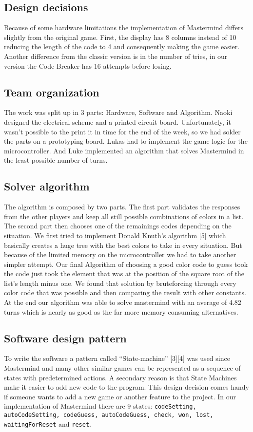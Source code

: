 \documentclass[a4paper, 12pt]{article}
\begin{document}
\subsection{Design decisions}
Because of some hardware limitations the implementation of Mastermind
differs slightly from the original game. First, the display has 8
columns instead of 10 reducing the length of the code to 4 and
consequently making the game easier. Another difference from the classic
version is in the number of tries, in our version the Code Breaker has
16 attempts before losing.

\subsection{Team organization}
The work was split up in 3 parts: Hardware, Software and Algorithm.
Naoki designed the electrical scheme and a printed circuit board.
Unfortunately, it wasn’t possible to the print it in time for the end of
the week, so we had solder the parts on a prototyping board. Lukas had
to implement the game logic for the microcontroller. And Luke
implemented an algorithm that solves Mastermind in the least possible
number of turns. 

\subsection{Solver algorithm}
The algorithm is composed by two parts. The first part validates the
responses from the other players and keep all still possible
combinations of colors in a list. The second part then chooses one of
the remainings codes depending on the situation. We first tried to
implement Donald Knuth's algorithm [5] which basically creates a huge
tree with the best colors to take in every situation. But because of the
limited memory on the microcontroller we had to take another simpler
attempt. Our final Algorithm of choosing a good color code to guess took
the code just took the element that was at the position of the square
root of the list’s length minus one. We found that solution by
bruteforcing through every color code that was possible and then
comparing the result with other constants. At the end our algorithm was
able to solve mastermind with an average of 4.82 turns which is nearly
as good as the far more memory consuming alternatives.

\subsection{Software design pattern}
To write the software a pattern called “State-machine” [3][4] was used
since Mastermind and many other similar games can be represented as a
sequence of states with predetermined actions. A secondary reason is
that State Machines make it easier to add new code to the program. This
design decision comes handy if someone wants to add a new game or
another feature to the project. In our implementation of Mastermind
there are 9 states: {\tt codeSetting, autoCodeSetting, codeGuess,
autoCodeGuess, check,  won, lost, waitingForReset} and {\tt reset}.
\end{document}
